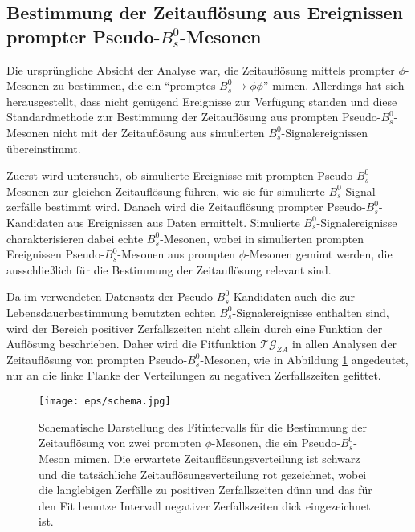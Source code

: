 \documentclass{article}
\begin{document}
\subsection{Bestimmung der Zeitauflösung aus Ereignissen prompter Pseudo-$B_s^0$-Mesonen}
Die ursprüngliche Absicht der Analyse war, die Zeitauflösung mittels prompter $\phi$-Mesonen zu bestimmen, die ein "`promptes $B_s^0\rightarrow\phi\phi$"' mimen. Allerdings hat sich herausgestellt, dass nicht genügend Ereignisse zur Verfügung standen und diese Standardmethode zur Bestimmung der Zeitauflösung aus prompten Pseudo-$B_s^0$-Mesonen nicht mit der Zeitauflösung aus simulierten $B_s^0$-Signalereignissen übereinstimmt.

Zuerst wird untersucht, ob simulierte Ereignisse mit prompten Pseudo-$B_s^0$-Mesonen zur gleichen Zeitauflösung führen, wie sie für simulierte $B_s^0$-Signal-zerfälle bestimmt wird. Danach wird die Zeitauflösung prompter Pseudo-$B_s^0$-Kandidaten aus Ereignissen aus Daten ermittelt. Simulierte $B_s^0$-Signalereignisse charakterisieren dabei echte $B_s^0$-Mesonen, wobei in simulierten prompten Ereignissen Pseudo-$B_s^0$-Mesonen aus prompten $\phi$-Mesonen gemimt werden, die ausschließlich für die Bestimmung der Zeitauflösung relevant sind.

Da im verwendeten Datensatz der Pseudo-$B_s^0$-Kandidaten auch die zur Lebensdauerbestimmung benutzten echten $B_s^0$-Signalereignisse enthalten sind, wird der Bereich positiver Zerfallszeiten nicht allein durch eine Funktion der Auflösung beschrieben. Daher wird die Fitfunktion $\mathcal{TG}_{ZA}$ in allen Analysen der Zeitauflösung von prompten Pseudo-$B_s^0$-Mesonen, wie in Abbildung \ref{fig:fitstrat} angedeutet, nur an die linke Flanke der Verteilungen zu negativen Zerfallszeiten gefittet. 

\begin{figure}[h!]
\centering
    \texttt{[image: eps/schema.jpg]}%
  \caption{Schematische Darstellung des Fitintervalls für die Bestimmung der Zeitauflösung von zwei prompten $\phi$-Mesonen, die ein Pseudo-$B_s^0$-Meson mimen. Die erwartete Zeitauflösungsverteilung ist schwarz und die tatsächliche Zeitauflösungsverteilung rot gezeichnet, wobei die langlebigen Zerfälle zu positiven Zerfallszeiten dünn und das für den Fit benutze Intervall negativer Zerfallszeiten dick eingezeichnet ist.}
\label{fig:fitstrat}
\end{figure}
\end{document}
